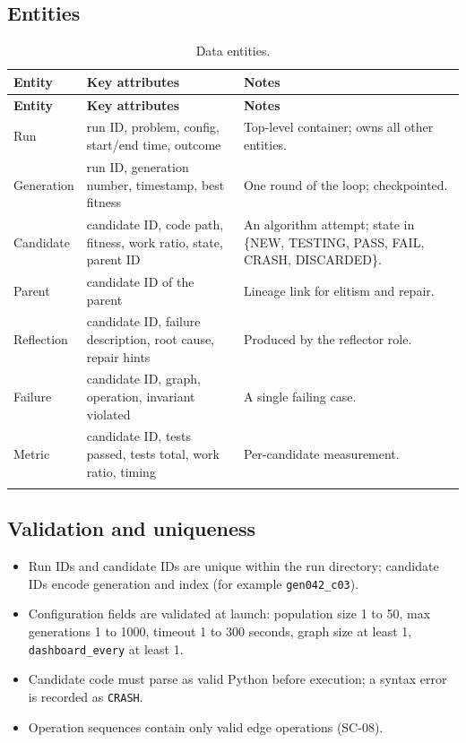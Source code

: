 \documentclass[12pt,a4paper]{article}
\begin{document}
\subsection{Entities}

\begin{center}
\footnotesize
\setlength{\tabcolsep}{4pt}
\begin{longtable}{@{}p{2.6cm}p{4.6cm}p{5.6cm}@{}}
\toprule
\textbf{Entity} & \textbf{Key attributes} & \textbf{Notes} \\
\midrule
\endfirsthead
\toprule
\textbf{Entity} & \textbf{Key attributes} & \textbf{Notes} \\
\midrule
\endhead
\bottomrule
\endfoot

Run & run ID, problem, config, start/end time, outcome & Top-level container; owns all other entities. \\
\addlinespace[2pt]
Generation & run ID, generation number, timestamp, best fitness & One round of the loop; checkpointed. \\
\addlinespace[2pt]
Candidate & candidate ID, code path, fitness, work ratio, state, parent ID & An algorithm attempt; state in \{NEW, TESTING, PASS, FAIL, CRASH, DISCARDED\}. \\
\addlinespace[2pt]
Parent & candidate ID of the parent & Lineage link for elitism and repair. \\
\addlinespace[2pt]
Reflection & candidate ID, failure description, root cause, repair hints & Produced by the reflector role. \\
\addlinespace[2pt]
Failure & candidate ID, graph, operation, invariant violated & A single failing case. \\
\addlinespace[2pt]
Metric & candidate ID, tests passed, tests total, work ratio, timing & Per-candidate measurement. \\
\bottomrule
\caption{Data entities.}
\label{tab:entities}
\end{longtable}
\end{center}

\subsection{Validation and uniqueness}

\begin{itemize}
  \item Run IDs and candidate IDs are unique within the run directory; candidate IDs encode generation and index (for example \texttt{gen042\_c03}).
  \item Configuration fields are validated at launch: population size 1 to 50, max generations 1 to 1000, timeout 1 to 300 seconds, graph size at least 1, \texttt{dashboard\_every} at least 1.
  \item Candidate code must parse as valid Python before execution; a syntax error is recorded as \texttt{CRASH}.
  \item Operation sequences contain only valid edge operations (SC-08).
\end{itemize}
\end{document}
